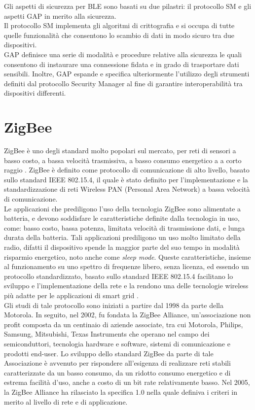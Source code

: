 \noindent Gli aspetti di sicurezza per BLE sono basati su due pilastri: il protocollo SM e gli aspetti GAP in merito alla sicurezza.\\
Il protocollo SM implementa gli algoritmi di crittografia e si occupa di tutte quelle funzionalità che consentono lo scambio di dati in modo sicuro tra due dispositivi.\\
GAP definisce una serie di modalità e procedure relative alla sicurezza le quali consentono di instaurare una connessione fidata e in grado di trasportare dati sensibili. Inoltre, GAP espande e specifica ulteriormente l'utilizzo degli strumenti definiti dal protocollo Security Manager al fine di garantire interoperabilità tra dispositivi differenti.

\section{ZigBee}
ZigBee è uno degli standard molto popolari sul mercato, per reti di sensori a basso costo, a bassa velocità trasmissiva, a basso consumo energetico a a corto raggio \cite{farahani2011zigbee}. ZigBee è definito come protocollo di comunicazione di alto livello, basato sullo standard IEEE 802.15.4, il quale è stato definito per l'implementazione e la standardizzazione di reti Wireless PAN (Personal Area Network) a bassa velocità di comunicazione.\\

\noindent Le applicazioni che prediligono l'uso della tecnologia ZigBee sono alimentate a batteria, e devono soddisfare le caratteristiche definite dalla tecnologia in uso, come: basso costo, bassa potenza, limitata velocità di trasmissione dati, e lunga durata della batteria. Tali applicazioni prediligono un uso molto limitato della radio, difatti il dispositivo spende la maggior parte del suo tempo in modalità risparmio energetico, noto anche come \textit{sleep mode}.
Queste caratteristiche, insieme al funzionamento su uno spettro di frequenze libero, senza licenza, ed essendo un protocollo standardizzato, basato sullo standard IEEE 802.15.4 facilitano lo sviluppo e l'implementazione della rete e la rendono una delle tecnologie wireless più adatte per le applicazioni di smart grid \cite{yi2010developing}.\\

\noindent Gli studi di tale protocollo sono iniziati a partire dal 1998 da parte della Motorola. In seguito, nel 2002, fu fondata la ZigBee Alliance, un'associazione non profit composta da un centinaio di aziende associate, tra cui Motorola, Philips, Samsung, Mitsubishi, Texas Instruments che operano nel campo dei semiconduttori, tecnologia hardware e software, sistemi di comunicazione e prodotti end-user. Lo sviluppo dello standard ZigBee da parte di tale Associazione è avvenuto per rispondere all'esigenza di realizzare reti stabili caratterizzate da un basso consumo, da un ridotto consumo energetico e di estrema facilità d'uso, anche a costo di un bit rate relativamente basso. Nel 2005, la ZigBee Alliance ha rilasciato la specifica 1.0 nella quale definiva i criteri in merito al livello di rete e di applicazione.

